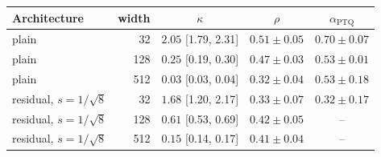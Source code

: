 \begin{tabular}{lrccc}
\toprule
Architecture & width & $\kappa$ & $\rho$ & $\alpha_{\mathrm{PTQ}}$ \\
\midrule
plain & 32 & $2.05$ {\scriptsize[1.79, 2.31]} & $0.51\pm0.05$ & $0.70\pm0.07$ \\
plain & 128 & $0.25$ {\scriptsize[0.19, 0.30]} & $0.47\pm0.03$ & $0.53\pm0.01$ \\
plain & 512 & $0.03$ {\scriptsize[0.03, 0.04]} & $0.32\pm0.04$ & $0.53\pm0.18$ \\
residual, $s=1/\sqrt8$ & 32 & $1.68$ {\scriptsize[1.20, 2.17]} & $0.33\pm0.07$ & $0.32\pm0.17$ \\
residual, $s=1/\sqrt8$ & 128 & $0.61$ {\scriptsize[0.53, 0.69]} & $0.42\pm0.05$ & -- \\
residual, $s=1/\sqrt8$ & 512 & $0.15$ {\scriptsize[0.14, 0.17]} & $0.41\pm0.04$ & -- \\
\bottomrule
\end{tabular}
